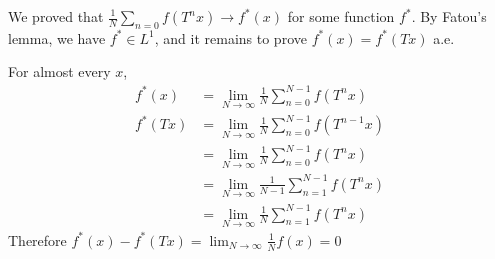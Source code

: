\documentclass[12pt,a4paper]{report}
\newenvironment{proof}
{\begin{changemargin}{1cm}{0.5cm} 
	}%
	{\end{changemargin}
}
\begin{document}
\begin{proof}
\quad We proved that $\frac{1}{N} \sum_{n=0} f(T^n x) \rightarrow f^*(x)$ for some function $f^*$. By Fatou's lemma, we have $f^* \in L^1$, and it remains to prove $f^*(x) = f^*(Tx)$ a.e.

\quad For almost every $x$,
\begin{align*}
f^*(x) &= \lim_{N\rightarrow \infty} \frac{1}{N} \sum_{n=0}^{N-1}f(T^n x) \\
f^*(Tx) &= \lim_{N\rightarrow \infty} \frac{1}{N} \sum_{n=0}^{N-1} f(T^{n-1} x) \\
&= \lim_{N\rightarrow \infty} \frac{1}{N} \sum_{n=0}^{N-1} f(T^n x) \\
&= \lim_{N\rightarrow \infty} \frac{1}{N-1} \sum_{n=1}^{N-1} f(T^n x) \\
&= \lim_{N\rightarrow \infty} \frac{1}{N} \sum_{n=1}^{N-1} f(T^n x)
\end{align*}
Therefore $f^*(x) - f^*(Tx) = \lim_{N\rightarrow \infty} \frac{1}{N}f(x) = 0$ 

\eop
\end{proof}

\newday
\end{document}
